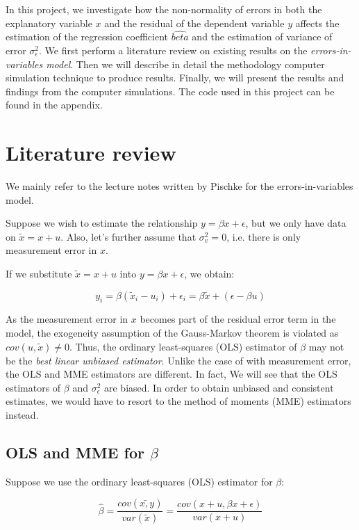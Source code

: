 \documentclass{article}
\begin{document}
In this project, we investigate how the non-normality of errors in both the explanatory variable $x$ and the residual of the dependent variable $y$ affects the estimation of the regression coefficient $\hat{beta}$ and the estimation of variance of error $\sigma^2_\epsilon$. We first perform a literature review on existing results on the \textit{errors-in-variables model}. Then we will describe in detail the methodology computer simulation technique to produce results. Finally, we will present the results and findings from
the computer simulations. The code used in this project can be found in the appendix.

\section{Literature review}

We mainly refer to the lecture notes written by Pischke \cite{lecturenotes} for the errors-in-variables model. 

Suppose we wish to estimate the relationship $y = \beta x + \epsilon$, but we only have data on $\tilde{x} = x + u$. Also, let's further assume that $\sigma_v^2 = 0$, i.e. there is only measurement error in $x$.

If we substitute $\tilde{x} = x+u$ into $y = \beta x + \epsilon$, we obtain:

\[
    y_i = \beta(\tilde{x}_i - u_i) + \epsilon_i = \beta \tilde{x} + (\epsilon - \beta u)
\]

As the measurement error in $x$ becomes part of the residual error term in the model, the exogeneity assumption of the Gauss-Markov theorem is violated as $cov(u, \tilde{x}) \neq 0$. Thus, the ordinary least-squares (OLS) estimator of $\beta$ may not be the \textit{best linear unbiased estimator}. Unlike the case of with measurement error, the OLS and MME estimators are different.
In fact, We will see that the OLS estimators of $\beta$ and $\sigma_\epsilon^2$ are biased. In order to obtain unbiased and consistent estimates, we would have to resort to the method of moments (MME)
estimators instead. 

\subsection{OLS and MME for $\beta$}

Suppose we use the ordinary least-squares (OLS) estimator for $\beta$:

\[
\hat{\beta} = \frac{cov(\tilde{x, y})}{var(\tilde{x})} = \frac{cov(x+u, \beta x + \epsilon)}{var(x + u)}
\]
\end{document}
